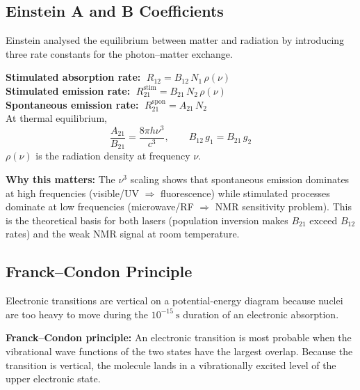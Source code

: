 \documentclass[12pt,a4paper]{article}
\begin{document}
\subsection{Einstein A and B Coefficients}
Einstein analysed the equilibrium between matter and radiation by introducing three rate constants for the photon--matter exchange.

\begin{tcolorbox}[formulabox, title={Einstein Coefficients}]
\textbf{Stimulated absorption rate:} $\;R_{12}=B_{12}\,N_1\,\rho(\nu)$\\
\textbf{Stimulated emission rate:} $\;R_{21}^{\mathrm{stim}}=B_{21}\,N_2\,\rho(\nu)$\\
\textbf{Spontaneous emission rate:} $\;R_{21}^{\mathrm{spon}}=A_{21}\,N_2$\\
At thermal equilibrium,
\[
\frac{A_{21}}{B_{21}}=\frac{8\pi h\nu^{3}}{c^{3}}, \qquad B_{12}\,g_1=B_{21}\,g_2
\]
$\rho(\nu)$ is the radiation density at frequency $\nu$.
\end{tcolorbox}

\textbf{Why this matters:} The $\nu^{3}$ scaling shows that spontaneous emission dominates at high frequencies (visible/UV $\Rightarrow$ fluorescence) while stimulated processes dominate at low frequencies (microwave/RF $\Rightarrow$ NMR sensitivity problem). This is the theoretical basis for both lasers (population inversion makes $B_{21}$ exceed $B_{12}$ rates) and the weak NMR signal at room temperature.

\subsection{Franck--Condon Principle}
Electronic transitions are vertical on a potential-energy diagram because nuclei are too heavy to move during the $10^{-15}\ \mathrm{s}$ duration of an electronic absorption.

\begin{tcolorbox}[defbox]
\textbf{Franck--Condon principle:} An electronic transition is most probable when the vibrational wave functions of the two states have the largest overlap. Because the transition is vertical, the molecule lands in a vibrationally excited level of the upper electronic state.
\end{tcolorbox}
\end{document}

